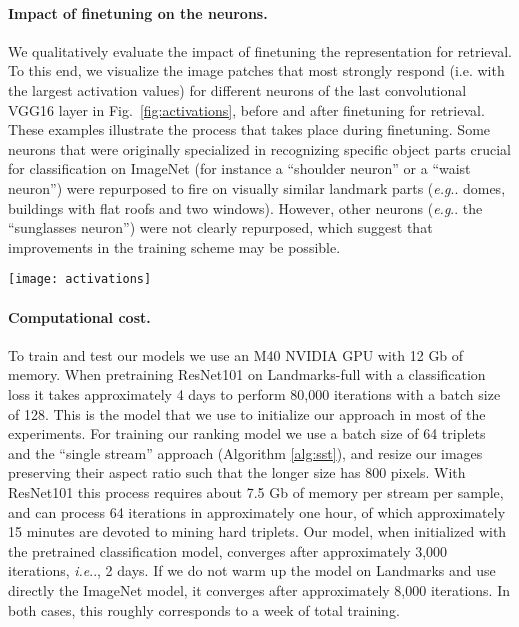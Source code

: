 \documentclass[twocolumn]{svjour3}          \smartqed  \usepackage{graphicx}
\makeatletter
\DeclareRobustCommand\onedot{\futurelet\@let@token\@onedot}
\def\@onedot{\ifx\@let@token.\else.\null\fi\xspace}
\def\eg{\emph{e.g}\onedot} \def\Eg{\emph{E.g}\onedot}
\def\ie{\emph{i.e}\onedot} \def\Ie{\emph{I.e}\onedot}
\makeatother
\begin{document}
\paragraph{Impact of finetuning on the neurons.}
We qualitatively evaluate the impact of finetuning the representation for retrieval. To this end, we visualize the image patches that most strongly respond (i.e. with the largest activation values) for different neurons of the last convolutional VGG16 layer in Fig.~\ref{fig:activations}, before and after finetuning for retrieval. These examples illustrate the process that takes place during finetuning. Some neurons that were originally specialized in recognizing specific object parts crucial for classification on ImageNet (for instance a ``shoulder neuron'' or a ``waist neuron'') were repurposed to fire on visually similar landmark parts (\eg domes, buildings with flat roofs and two windows). However, other neurons (\eg the ``sunglasses neuron'') were not clearly repurposed, which suggest that improvements in the training scheme may be possible.
 
 \begin{figure*}[th!]
\centering
 \texttt{[image: activations]}
 \caption{\label{fig:activations} Visualization of the neuron adaptation during training. Image patches with largest activation values for some neurons of layer ``conv5\_3'' from VGG16, before (top) and after (bottom) finetuning for retrieval. See text for more details.}
 \end{figure*}



\paragraph{Computational cost.}
To train and test our models we use an M40 NVIDIA GPU with 12 Gb of memory.
When pretraining ResNet101 on Landmarks-full with a classification loss it takes approximately 4 days to perform 80,000 iterations with a batch size of 128. This is the model that we use to initialize our approach in most of the experiments.
For training our ranking model we use a batch size of 64 triplets and the ``single stream'' approach (Algorithm \ref{alg:sst}), and resize our images preserving their aspect ratio such that the longer size has 800 pixels. With ResNet101 this process requires about 7.5 Gb of memory per stream per sample, and can process 64 iterations in approximately one hour, of which approximately 15 minutes are devoted to mining hard triplets. Our model, when initialized with the pretrained classification model, converges after approximately 3,000 iterations, \ie, 2 days. If we do not warm up the model on Landmarks and use directly the ImageNet model, it converges after approximately 8,000 iterations. In both cases, this roughly corresponds to a week of total training.
\end{document}
